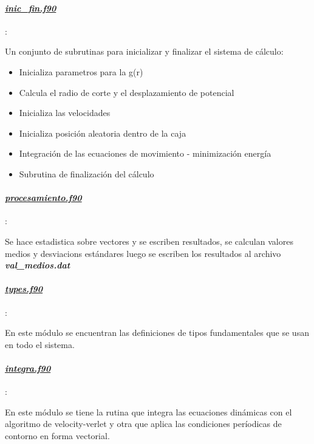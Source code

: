 \paragraph{\underline{\textit{inic\_fin.f90}}}:


Un conjunto de subrutinas para inicializar y finalizar el sistema de cálculo:

\begin{itemize}
  \item  Inicializa parametros para la g(r)
  \item  Calcula el radio de corte y el desplazamiento de potencial

  \item Inicializa las velocidades

  \item Inicializa posición aleatoria dentro de la caja

  \item Integración de las ecuaciones de movimiento - minimización energía

  \item Subrutina de finalización  del cálculo
\end{itemize}


\paragraph{\underline{\textit{procesamiento.f90}}}:


 Se hace estadistica sobre vectores y se escriben  resultados, se calculan 
 valores medios y desviacions estándares
 luego  se escriben los resultados al archivo \textbf{\textit{val\_medios.dat}}

\paragraph{\underline{\textit{types.f90}}}:

En este módulo se encuentran las definiciones de tipos fundamentales que se usan 
en todo el sistema.




\paragraph{\underline{\textit{integra.f90}}}:

 En este módulo se tiene la rutina que  integra las ecuaciones dinámicas 
 con el algoritmo de velocity-verlet y otra que aplica las condiciones períodicas 
 de contorno en forma vectorial.

